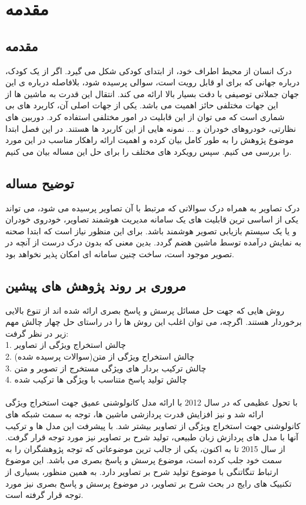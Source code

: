 \chapter{مقدمه}
\section{مقدمه}
درک انسان از محیط اطراف خود، از ابتدای کودکی شکل می گیرد. اگر از یک کودک، درباره جهانی که برای او قابل رویت است، سوالی پرسیده شود، بلافاصله درباره ی این جهان جملاتی توصیفی با دقت بسیار بالا ارائه می کند. انتقال این قدرت به ماشین ها از این جهات مختلفی حائز اهمیت می باشد. یکی از جهات اصلی آن، کاربرد های بی شماری است که می توان از این قابلیت در امور مختلفی استفاده کرد. دوربین های نظارتی، خودروهای خودران و ... نمونه هایی از این کاربرد ها هستند. در این فصل ابتدا موضوع پژوهش را به طور کامل بیان کرده و اهمیت ارائه راهکار مناسب در این مورد را بررسی می کنیم.
سپس رویکرد های مختلف را برای حل این مساله بیان می کنیم.
\section{توضیح مساله}\label{sec2}
درک تصاویر به همراه درک سوالاتی که مرتبط با آن تصاویر پرسیده می شود، می تواند یکی از اساسی ترین قابلیت های یک سامانه مدیریت هوشمند تصاویر، خودروی خودران و یا یک سیستم بازیابی تصویر هوشمند باشد.
برای این منظور نیاز است که ابتدا صحنه به نمایش درآمده توسط ماشین هضم گردد. بدین معنی که بدون درک درست از آنچه در تصویر موجود است، ساخت چنین سامانه ای امکان پذیر نخواهد بود. 

\section{مروری بر روند پژوهش های پیشین}
روش هایی که جهت حل مسائل پرسش و پاسخ بصری ارائه شده اند از تنوع بالایی برخوردار هستند. اگرچه، می توان اغلب این روش ها را در راستای حل چهار چالش مهم زیر در نظر گرفت:\\
1. چالش استخراج ویژگی از تصاویر\\
2. چالش استخراج ویژگی از متن(سوالات پرسیده شده)\\
3. چالش ترکیب بردار های ویژگی مستخرج از تصویر و متن\\
4. چالش تولید پاسخ متناسب با ویژگی ها ترکیب شده\\
\\
با تحول عظیمی که در سال 2012 با ارائه مدل کانولوشنی عمیق جهت استخراج ویژگی ارائه شد و نیز افزایش قدرت پردازشی ماشین ها، توجه به سمت شبکه های کانولوشنی جهت استخراج ویژگی از تصاویر بیشتر شد. با پیشرفت این مدل ها و ترکیب آنها با مدل های پردازش زبان طبیعی، تولید شرح بر تصاویر نیز مورد توجه قرار گرفت. از سال 2015 تا به اکنون، یکی از جالب ترین موضوعاتی که توجه پژوهشگران را به سمت خود جلب کرده است، موضوع پرسش و پاسخ بصری می باشد. این موضوع ارتباط تنگاتنگی با موضوع تولید شرح بر تصاویر دارد. به همین منظور، بسیاری از تکنییک های رایج در بحث شرح بر تصاویر، در موضوع پرسش و پاسخ بصری نیز مورد توجه قرار گرفته است.